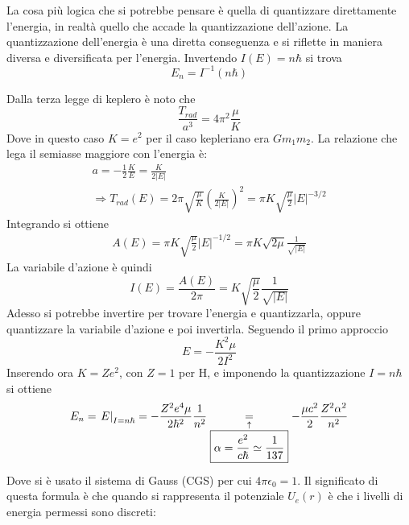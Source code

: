 \documentclass[Main.tex]{subfiles}
\begin{document}
\begin{osservazione}
	La cosa più logica che si potrebbe pensare è quella di quantizzare direttamente l'energia, in realtà quello che accade  la quantizzazione dell'azione. La quantizzazione dell'energia è una diretta conseguenza e si riflette in maniera diversa e diversificata per l'energia. Invertendo $I(E) = n \hbar$ si trova
	\begin{equation}
		E_n = I^{-1} (n \hbar)
	\end{equation}
\end{osservazione}
Dalla terza legge di keplero è noto che 
\begin{equation}
	\frac{T_{rad}}{a^3}= 4 \pi^2 \frac{\mu}{K}
\end{equation}
Dove in questo caso $K=e^2$ per il caso kepleriano era $Gm_1m_2$. La relazione che lega il semiasse maggiore con l'energia è:
\begin{gather}
	a= - \frac{1}{2} \frac{K}{E}= \frac{K}{2 |E|}\\
	\Rightarrow T_{rad}(E)= 2 \pi \sqrt{\frac{\mu}{K}} \left( \frac{K}{2|E|} \right)^2 = \pi K \sqrt{\frac{\mu}{2}} |E|^{-3/2}
\end{gather}
Integrando si ottiene
\begin{gather}
	A(E) = \pi K \sqrt{\frac{\mu}{2}} |E|^{-1/2} = \boxed{ \pi K \sqrt{2 \mu} \frac{1}{\sqrt{|E|}}}
\end{gather}
La variabile d'azione è quindi
\begin{equation}
	I(E) =\frac{A(E)}{2 \pi} = K \sqrt{\frac{\mu}{2}} \frac{1}{\sqrt{|E|}}
\end{equation}
Adesso si potrebbe invertire per trovare l'energia e quantizzarla, oppure quantizzare la variabile d'azione e poi invertirla. Seguendo il primo approccio
\begin{equation}
	E=- \frac{K^2 \mu }{2 I^2}
\end{equation}
Inserendo ora $K=Ze^2$, con $Z=1$ per H, e imponendo la quantizzazione $I=n \hbar$ si ottiene
\begin{equation}\notag
	E_n = \left. E \right|_{I=n \hbar} = - \frac{Z^2 e^4 \mu}{2 \hbar^2} \frac{1}{n^2} \underset{\underset{ \boxed{\alpha=\frac{e^2}{c \hbar} \simeq \frac{1}{137}}}{\uparrow}}{=} - \frac{\mu c^2}{2} \frac{Z^2 \alpha^2}{n^2}
\end{equation}
Dove si è usato il sistema di Gauss (CGS) per cui $4 \pi \epsilon_0 =1$. Il significato di questa formula è che quando si rappresenta il potenziale $U_e(r)$ è che i livelli di energia permessi sono discreti:
\end{document}
